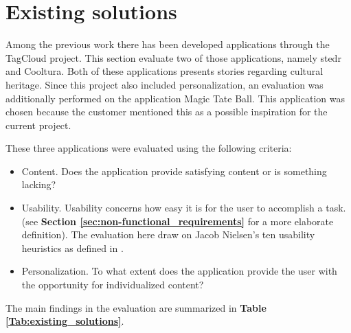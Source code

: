 \section{Existing solutions}

Among the previous work there has been developed applications through the TagCloud project. This section evaluate two of those applications, namely stedr and Cooltura. Both of these applications presents stories regarding cultural heritage. Since this project also included personalization, an evaluation was additionally performed on the application Magic Tate Ball. This application was chosen because the customer mentioned this as a possible inspiration for the current project. \newline

These three applications were evaluated using the following criteria:
\begin{itemize}
\item Content. Does the application provide satisfying content or is something lacking?
\item Usability. Usability concerns how easy it is for the user to accomplish a task. (see \textbf{Section \ref{sec:non-functional_requirements}} for a more elaborate definition). The evaluation here draw on Jacob Nielsen’s ten usability heuristics as defined in \cite{AS3}.  
\item Personalization. To what extent does the application provide the user with the opportunity for individualized content?
\end{itemize}

The main findings in the evaluation are summarized in \textbf{Table \ref{Tab:existing_solutions}}.

